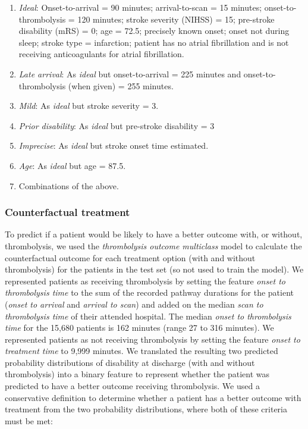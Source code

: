 \begin{enumerate}
    \item \textit{Ideal}: Onset-to-arrival = 90 minutes; arrival-to-scan = 15 minutes; onset-to-thrombolysis = 120 minutes; stroke severity (NIHSS) = 15; pre-stroke disability (mRS) = 0; age = 72.5; precisely known onset; onset not during sleep; stroke type = infarction; patient has no atrial fibrillation and is not receiving anticoagulants for atrial fibrillation.

    \item \textit{Late arrival}: As \textit{ideal} but onset-to-arrival = 225 minutes and onset-to-thrombolysis (when given) = 255 minutes.

    \item \textit{Mild}: As \textit{ideal} but stroke severity = 3.

    \item \textit{Prior disability}: As \textit{ideal} but pre-stroke disability = 3

    \item \textit{Imprecise}: As \textit{ideal} but stroke onset time estimated.

    \item \textit{Age}: As \textit{ideal} but age = 87.5.

    \item Combinations of the above.
\end{enumerate}


\subsubsection{Counterfactual treatment}

To predict if a patient would be likely to have a better outcome with, or without, thrombolysis, we used the \textit{thrombolysis outcome multiclass} model to calculate the counterfactual outcome for each treatment option (with and without thrombolysis) for the patients in the test set (so not used to train the model). We represented patients as receiving thrombolysis by setting the feature \textit{onset to thrombolysis time} to the sum of the recorded pathway durations for the patient (\textit{onset to arrival} and \textit{arrival to scan}) and added on the median \textit{scan to thrombolysis time} of their attended hospital. The median \textit{onset to thrombolysis time} for the 15,680 patients is 162 minutes (range 27 to 316 minutes). We represented patients as not receiving thrombolysis by setting the feature \textit{onset to treatment time} to 9,999 minutes. We translated the resulting two predicted probability distributions of disability at discharge (with and without thrombolysis) into a binary feature to represent whether the patient was predicted to have a better outcome receiving thrombolysis. We used a conservative definition to determine whether a patient has a better outcome with treatment from the two probability distributions, where both of these criteria must be met: 


